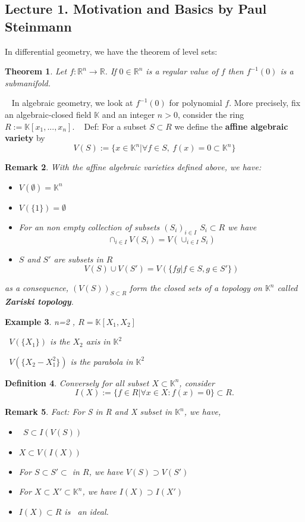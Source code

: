 \documentclass[11pt]{article}
\newtheorem{thm}{Theorem}[section]
\newtheorem{dfn}[thm]{Definition}
\newtheorem{rmk}[thm]{Remark}
\newtheorem{ex}[thm]{Example}
\newcommand{\reals}{\mathbb R}
\newcommand{\bbk}{\mathbb K}
\begin{document}
\subsection{Lecture 1. Motivation and Basics by Paul Steinmann}
In differential geometry, we have the theorem of level sets:
\begin{thm}
Let $f:\reals^n \rightarrow \reals$.
If $0 \in \reals^n$ is a regular value of $f$ then $f^{-1}(0)$ is a submanifold.
\end{thm} 
 
In algebraic geometry, we look at $f^{-1}(0)$ for polynomial $f$.
More precisely, fix an algebraic-closed field $\bbk$ and an integer $n>0$, consider the ring $R:=\bbk[x_1,...,x_n]$.
 
Def: For a subset $S\subset R$ we define the \textbf{affine algebraic variety} by
\begin{equation}
V(S):=\{x\in \bbk^n| \forall f \in S,\ f(x)=0\subset \bbk^n\}
\end{equation}
\begin{rmk}
With the affine algebraic varieties defined above, we have:
\begin{itemize}
\item $V(\emptyset)=\bbk^n$
\item $ V(\{1\})=\emptyset$
\item   For an non empty collection of subsets $(S_i)_{i\in I}$ $S_i\subset R$ we have 
\begin{equation*}
    \cap_{i\in I}V(S_i)=V(\cup_{i\in I} S_i)
\end{equation*}
\item $S$ and $S'$ are subsets in $R$
\begin{equation*}
    V(S)\cup V(S')=V(\{fg| f\in S, g\in S'\})
\end{equation*}
\end{itemize}
as a consequence, 
    $(V(S))_{S\subset R}$ form the closed sets of a topology on $\bbk^n$ called \textbf{Zariski topology}.
\end{rmk}
\begin{ex}
n=2 , $R=\bbk[X_1,X_2]$

 $V(\{X_1\})$ is the $X_2$ axis in $\bbk^2$

 $V(\{X_2-X_1^2\})$ is the parabola in $\bbk^2$
\end{ex}

\begin{dfn}
Conversely for all subset $X \subset \bbk^n$, consider 
          $$ I(X):=\{f\in R | \forall x\in X: f(x)=0\}\subset R.$$
\end{dfn}
\begin{rmk}
Fact: For S in R and X subset in $\bbk^n$, we have, 
\begin{itemize}
\item
 $S\subset I(V(S))$
\item
 $X \subset V(I(X))$
\item
 For $S\subset S' \subset$ in $R$, we have $V(S)\supset V(S')$
\item
 For $X \subset X'\subset \bbk^n$, we have $ I(X)\supset I(X')$
\item
 $I(X) \subset R$ is  an ideal.
\end{itemize}
\end{rmk}
\end{document}
